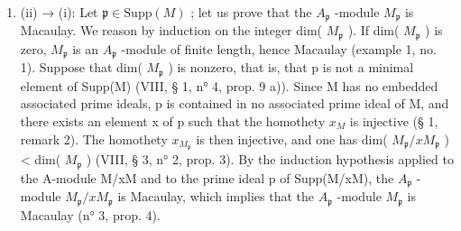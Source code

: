 \begin{enumerate}
\def\labelenumi{(\roman{enumi})}
\setcounter{enumi}{1}
\tightlist
\item
  (ii) → (i): Let \(\mathfrak{p} \in \text{Supp}(M)\) ; let us prove that the \(A_{\mathfrak{p}}\) -module \(M_{\mathfrak{p}}\) is Macaulay. We reason by induction on the integer dim( \(M_{\mathfrak{p}}\) ). If dim( \(M_{\mathfrak{p}}\) ) is zero, \(M_{\mathfrak{p}}\) is an \(A_{\mathfrak{p}}\) -module of finite length, hence Macaulay (example 1, no. 1). Suppose that dim( \(M_{\mathfrak{p}}\) ) is nonzero, that is, that p is not a minimal element of Supp(M) (VIII, § 1, n° 4, prop. 9 a)). Since M has no embedded associated prime ideals, p is contained in no associated prime ideal of M, and there exists an element x of p such that the homothety \(x_{M}\) is injective (§ 1, remark 2). The homothety \(x_{M_{\mathfrak{p}}}\) is then injective, and one has dim( \(M_{\mathfrak{p}}/xM_{\mathfrak{p}}\) ) \textless{} dim( \(M_{\mathfrak{p}}\) ) (VIII, § 3, n° 2, prop. 3). By the induction hypothesis applied to the A-module M/xM and to the prime ideal p of Supp(M/xM), the \(A_{\mathfrak{p}}\) -module \(M_{\mathfrak{p}}/xM_{\mathfrak{p}}\) is Macaulay, which implies that the \(A_{\mathfrak{p}}\) -module \(M_{\mathfrak{p}}\) is Macaulay (n° 3, prop. 4).
\end{enumerate}

